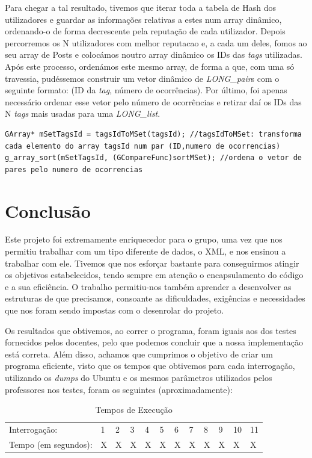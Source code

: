 \documentclass[a4paper, 11pt, oneside]{article}
\begin{document}
Para chegar a tal resultado, tivemos que iterar toda a tabela de Hash dos utilizadores e guardar as informações relativas a estes num array dinâmico, ordenando-o de forma decrescente pela reputação de cada utilizador. Depois percorremos os N utilizadores com melhor reputacao e, a cada um deles, fomos ao seu array de Posts e colocámos noutro array dinâmico os IDs das \textit{tags} utilizadas. Após este processo, ordenámos este mesmo array, de forma a que, com uma só travessia, pudéssemos construir um vetor dinâmico de \textit{LONG\_pair}s com o seguinte formato: (ID da \textit{tag}, número de ocorrências). Por último, foi apenas necessário ordenar esse vetor pelo número de ocorrências e retirar daí os IDs das N \textit{tags} mais usadas para uma \textit{LONG\_list}.

\begin{lstlisting}[caption=Query 11 - conversão do array de tags para um de pares e respetiva ordenação]
GArray* mSetTagsId = tagsIdToMSet(tagsId); //tagsIdToMSet: transforma cada elemento do array tagsId num par (ID,numero de ocorrencias)
g_array_sort(mSetTagsId, (GCompareFunc)sortMSet); //ordena o vetor de pares pelo numero de ocorrencias
\end{lstlisting}

\section{Conclusão}
Este projeto foi extremamente enriquecedor para o grupo, uma vez que nos permitiu trabalhar com um tipo diferente de dados, o XML, e nos ensinou a trabalhar com ele. Tivemos que nos esforçar bastante para conseguirmos atingir os objetivos estabelecidos, tendo sempre em atenção o encapsulamento do código e a sua eficiência. O trabalho permitiu-nos também aprender a desenvolver as estruturas de que precisamos, consoante as dificuldades, exigências e necessidades
que nos foram sendo impostas com o desenrolar do projeto.

Os resultados que obtivemos, ao correr o programa, foram iguais aos dos testes fornecidos pelos docentes, pelo que podemos concluir que a nossa implementação está correta. Além disso, achamos que cumprimos o objetivo de criar um programa eficiente, visto que os tempos que obtivemos para cada interrogação, utilizando os \textit{dumps} do Ubuntu e os mesmos parâmetros utilizados pelos professores nos testes, foram os seguintes (aproximadamente):
\begin{table}[h]
\centering
\caption{Tempos de Execução}
\begin{tabular}{llllllllllll}
Interrogação:        & 1 & 2 & 3 & 4 & 5 & 6 & 7 & 8 & 9 & 10 & 11 \\
Tempo (em segundos): & X & X & X & X & X & X & X & X & X & X  & X 
\end{tabular}
\end{table}
\end{document}
